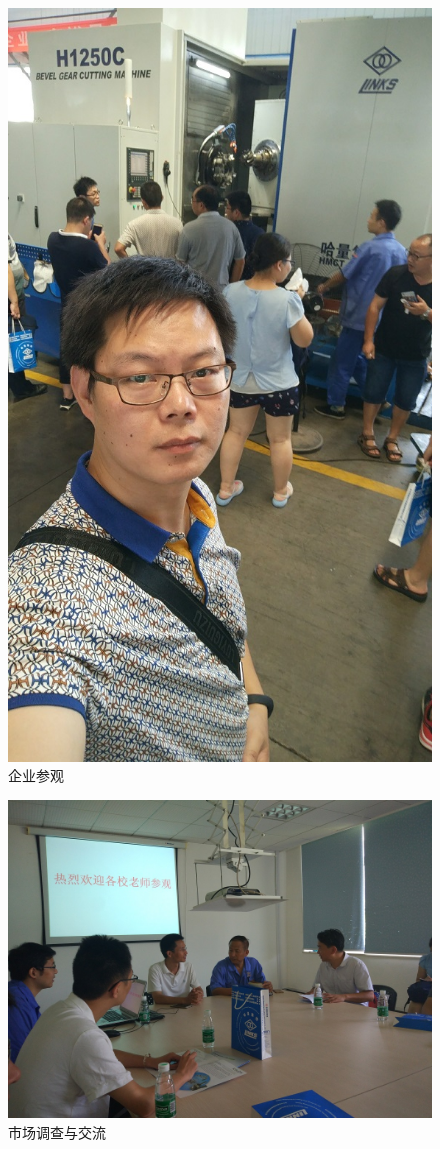\documentclass[12pt,a4paper]{ctexart}
\begin{document}
\begin{figure}[h]
	\begin{center}
		\includegraphics[width=0.8\linewidth]{image/8}
		\caption{企业参观 }
	\end{center}
\end{figure}

\begin{figure}[h]
	\begin{center}
		\includegraphics[width=0.8\linewidth]{image/9}
		\caption{市场调查与交流 }
	\end{center}
\end{figure}
\end{document}
